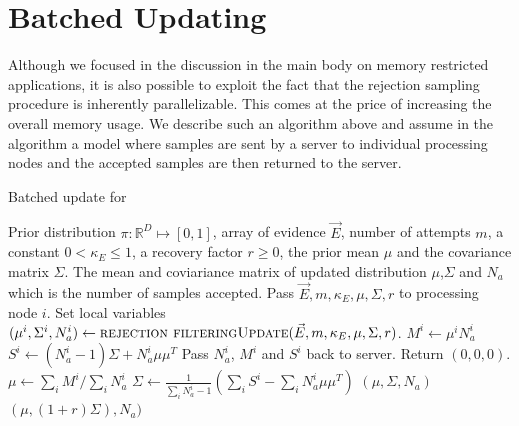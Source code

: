 \documentclass[twoside]{article}
\newcommand{\CRej}{\text{rejection filtering}}
\begin{document}
\section{Batched Updating}
\label{app:batched-updates}

Although we focused in the discussion in the main body on memory restricted applications, it is also possible to exploit the fact that the
rejection sampling procedure is inherently parallelizable.  This comes at the price of increasing the overall
memory usage.  We describe such an algorithm above and assume in the algorithm a model where samples are sent by a server to
individual processing nodes and the accepted samples are then returned to the server.

\begin{algorithm}
    \caption{Batched update for \CRej}
    \label{alg:batchcrej}
    \begin{algorithmic}
        \Require Prior distribution $\pi:\mathbb{R}^D \mapsto [0,1]$, array of evidence $\vec{E}$, number of attempts $m$, a constant $0<\kappa_E\le 1$, a recovery factor $r \ge 0$, the prior mean $\mu$ and the covariance matrix $\Sigma$.
        \Ensure  The mean and coviariance matrix of updated distribution $\mu$,$\Sigma$ and $N_a$ which is the number of samples accepted.
  \State Pass $\vec{E},m,\kappa_E, \mu,\Sigma,r$ to processing node $i$.
  \State Set local variables $(\mu^{i}, \Sigma^{i},N_a^{i})\gets \Call{\CRej Update}{\vec{E},m,\kappa_E,\mu,\Sigma,r}$.
  \State $M^i \gets \mu^i N_a^i$
  \State $S^i \gets (N_a^i-1)\Sigma +N_a^i\mu\mu^T$ 
  \State Pass $N_a^i$, $M^i$ and $S^i$ back to server.       
  \Else \State Return $(0,0,0)$.
  \EndIf
  \EndFor
     \State $\mu\gets \sum_i M^{i}/\sum_i N_a^i $
     \State $\Sigma \gets \frac{1}{\sum_i N_a^i -1}\left(\sum_i S^i - \sum_i N_a^i \mu\mu^T \right)$
  \State\Return $(\mu,\Sigma,N_a)$
   \Else
  \State\Return $(\mu, (1+r)\Sigma),N_a)$

   \EndIf
          
        \EndFunction
    \end{algorithmic}
\end{algorithm}
\end{document}
